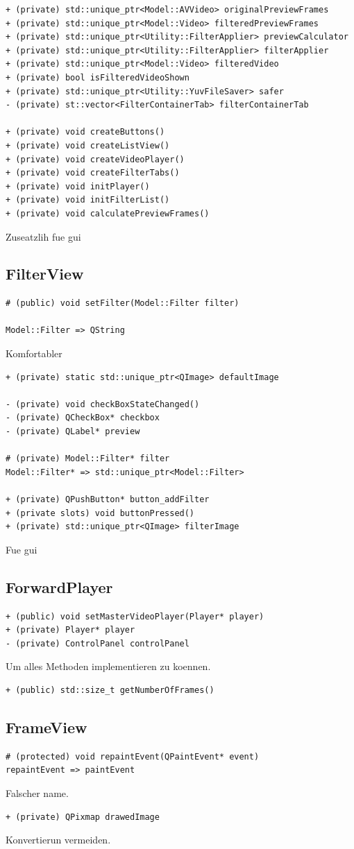 \documentclass{scrartcl}
\begin{document}
{\begin{verbatim}
+ (private) std::unique_ptr<Model::AVVideo> originalPreviewFrames
+ (private) std::unique_ptr<Model::Video> filteredPreviewFrames
+ (private) std::unique_ptr<Utility::FilterApplier> previewCalculator
+ (private) std::unique_ptr<Utility::FilterApplier> filterApplier
+ (private) std::unique_ptr<Model::Video> filteredVideo
+ (private) bool isFilteredVideoShown
+ (private) std::unique_ptr<Utility::YuvFileSaver> safer
- (private) st::vector<FilterContainerTab> filterContainerTab

+ (private) void createButtons()
+ (private) void createListView()
+ (private) void createVideoPlayer()
+ (private) void createFilterTabs()
+ (private) void initPlayer()
+ (private) void initFilterList()
+ (private) void calculatePreviewFrames()
\end{verbatim}
Zuseatzlih fue gui
\subsection{FilterView}
\begin{verbatim}
# (public) void setFilter(Model::Filter filter)

Model::Filter => QString
\end{verbatim}
Komfortabler
\begin{verbatim}
+ (private) static std::unique_ptr<QImage> defaultImage

- (private) void checkBoxStateChanged()
- (private) QCheckBox* checkbox
- (private) QLabel* preview

# (private) Model::Filter* filter
Model::Filter* => std::unique_ptr<Model::Filter>

+ (private) QPushButton* button_addFilter
+ (private slots) void buttonPressed()
+ (private) std::unique_ptr<QImage> filterImage
\end{verbatim}
Fue gui
\subsection{ForwardPlayer}
\begin{verbatim}
+ (public) void setMasterVideoPlayer(Player* player)
+ (private) Player* player
- (private) ControlPanel controlPanel
\end{verbatim}
Um alles Methoden implementieren zu koennen.
\begin{verbatim}
+ (public) std::size_t getNumberOfFrames()
\end{verbatim}
\subsection{FrameView}
\begin{verbatim}
# (protected) void repaintEvent(QPaintEvent* event)
repaintEvent => paintEvent
\end{verbatim}
Falscher name.
\begin{verbatim}
+ (private) QPixmap drawedImage
\end{verbatim}
Konvertierun vermeiden.
}
\end{document}
